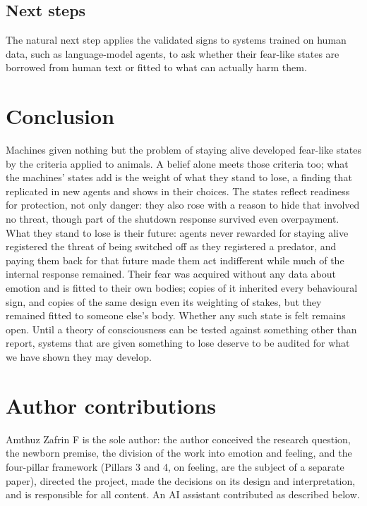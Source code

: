 \documentclass[11pt]{article}
\begin{document}
\subsection{Next steps}

The natural next step applies the validated signs to systems trained on human data, such as language-model agents, to ask whether their fear-like states are borrowed from human text or fitted to what can actually harm them.

\section{Conclusion}

Machines given nothing but the problem of staying alive developed fear-like states by the criteria applied to animals. A belief alone meets those criteria too; what the machines' states add is the weight of what they stand to lose, a finding that replicated in new agents and shows in their choices. The states reflect readiness for protection, not only danger: they also rose with a reason to hide that involved no threat, though part of the shutdown response survived even overpayment. What they stand to lose is their future: agents never rewarded for staying alive registered the threat of being switched off as they registered a predator, and paying them back for that future made them act indifferent while much of the internal response remained. Their fear was acquired without any data about emotion and is fitted to their own bodies; copies of it inherited every behavioural sign, and copies of the same design even its weighting of stakes, but they remained fitted to someone else's body. Whether any such state is felt remains open. Until a theory of consciousness can be tested against something other than report, systems that are given something to lose deserve to be audited for what we have shown they may develop.

\section*{Author contributions}
Amthuz Zafrin F is the sole author: the author conceived the research question, the newborn premise, the division of the work into emotion and feeling, and the four-pillar framework (Pillars 3 and 4, on feeling, are the subject of a separate paper), directed the project, made the decisions on its design and interpretation, and is responsible for all content. An AI assistant contributed as described below.
\end{document}
